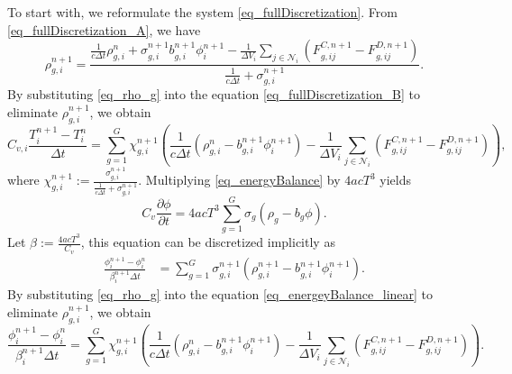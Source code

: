 \documentclass[preprint,12pt]{elsarticle}
\theoremstyle{definition}
\theoremstyle{plain}
\numberwithin{equation}{section}
\numberwithin{algorithm}{section}
\newcounter{eq_count}
\newcommand{\pdrv}[2]{\frac{\partial{#1}}{\partial{#2}}}
\begin{document}
     To start with, we reformulate the system \eqref{eq_fullDiscretization}. From \eqref{eq_fullDiscretization_A}, we have 
     \begin{equation} \label{eq_rho_g}
     	\rho_{g,i}^{n+1}=\frac{\frac{1}{c \Delta t}\rho_{g,i}^n+ \sigma_{g,i}^{n+1} b_{g,i}^{n+1} \phi_i^{n+1} -   \frac{1}{\Delta V_i} \sum_{j \in \mathcal{N}_i} 
     		\left( F_{g,ij}^{C,n+1} -  F_{g,ij}^{D,n+1} \right)}{\frac{1}{c \Delta t}+ \sigma_{g,i}^{n+1}}.
     \end{equation}
     By substituting \eqref{eq_rho_g} into the equation  \eqref{eq_fullDiscretization_B} to eliminate $\rho_{g,i}^{n+1}$, we obtain
     \begin{equation} \label{eq_correction_A}
     	C_{v,i} \frac{T^{n+1}_i - T^n_i}{\Delta t}=\sum_{g=1}^{G} \chi_{g,i}^{n+1} \left( \frac{1}{c \Delta t}
     	\left(\rho_{g,i}^n -  b_{g,i}^{n+1} \phi_i^{n+1}  \right)  -   \frac{1}{\Delta V_i} \sum_{j \in \mathcal{N}_i} 
     	\left( F_{g,ij}^{C,n+1} -  F_{g,ij}^{D,n+1} \right)\right),
     \end{equation}
     where $\chi_{g,i}^{n+1} := \frac{\sigma_{g,i}^{n+1}}{\frac{1}{c \Delta t} + \sigma_{g,i}^{n+1}}$. Multiplying  \eqref{eq_energyBalance} by $4acT^3$ yields
     \begin{equation*}
     	C_v \pdrv{\phi}{t}=4acT^3\sum_{g=1}^{G} \sigma_{g}  \left(\rho_g- b_g  \phi \right) .
     \end{equation*} 
     Let $\beta := \frac{4acT^3}{C_v}$, this equation can be discretized implicitly as
     \begin{equation}\label{eq_energeyBalance_linear}
     	\begin{aligned}
     		\frac{ \phi_{i}^{n+1} - \phi_{i}^n }{\beta_{i}^{n+1} \Delta t} 
     		&=  \sum_{g=1}^{G} \sigma_{g,i}^{n+1} \left(  \rho_{g,i}^{n+1} 
     		-  b_{g,i}^{n+1} \phi_i^{n+1} \right).
     	\end{aligned}
     \end{equation} 
          By substituting \eqref{eq_rho_g} into the equation  \eqref{eq_energeyBalance_linear} to eliminate $\rho_{g,i}^{n+1}$, we obtain
        \begin{equation} \label{eq_prediction_A}
     	 \frac{\phi^{n+1}_i - \phi^n_i}{ \beta_i^{n+1} \Delta t}=\sum_{g=1}^{G} \chi_{g,i}^{n+1} \left( \frac{1}{c \Delta t}\left(\rho_{g,i}^n -  b_{g,i}^{n+1} \phi_i^{n+1}  \right)  -   \frac{1}{\Delta V_i} \sum_{j \in \mathcal{N}_i} 
     	\left( F_{g,ij}^{C,n+1} -  F_{g,ij}^{D,n+1} \right)\right) .
     \end{equation}
\end{document}
